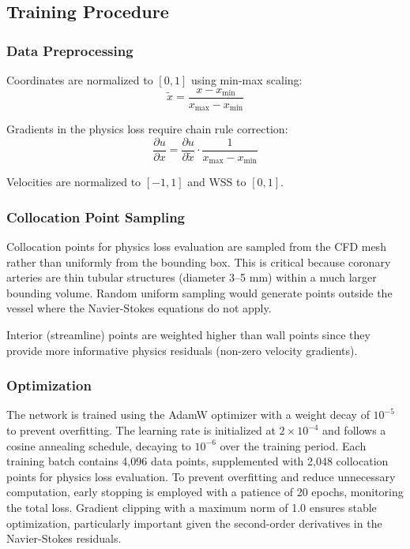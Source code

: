 \documentclass[12pt,a4paper]{article}
\begin{document}
\subsection{Training Procedure}

\subsubsection{Data Preprocessing}
Coordinates are normalized to $[0, 1]$ using min-max scaling:
\begin{equation}
    \tilde{x} = \frac{x - x_{\min}}{x_{\max} - x_{\min}}
\end{equation}

Gradients in the physics loss require chain rule correction:
\begin{equation}
    \frac{\partial u}{\partial x} = \frac{\partial u}{\partial \tilde{x}} \cdot \frac{1}{x_{\max} - x_{\min}}
\end{equation}

Velocities are normalized to $[-1, 1]$ and WSS to $[0, 1]$.

\subsubsection{Collocation Point Sampling}
Collocation points for physics loss evaluation are sampled from the CFD mesh rather than uniformly from the bounding box. This is critical because coronary arteries are thin tubular structures (diameter 3--5 mm) within a much larger bounding volume. Random uniform sampling would generate points outside the vessel where the Navier-Stokes equations do not apply.

Interior (streamline) points are weighted higher than wall points since they provide more informative physics residuals (non-zero velocity gradients).

\subsubsection{Optimization}
The network is trained using the AdamW optimizer with a weight decay of $10^{-5}$ to prevent overfitting. The learning rate is initialized at $2 \times 10^{-4}$ and follows a cosine annealing schedule, decaying to $10^{-6}$ over the training period. Each training batch contains 4,096 data points, supplemented with 2,048 collocation points for physics loss evaluation. To prevent overfitting and reduce unnecessary computation, early stopping is employed with a patience of 20 epochs, monitoring the total loss. Gradient clipping with a maximum norm of 1.0 ensures stable optimization, particularly important given the second-order derivatives in the Navier-Stokes residuals.
\end{document}
